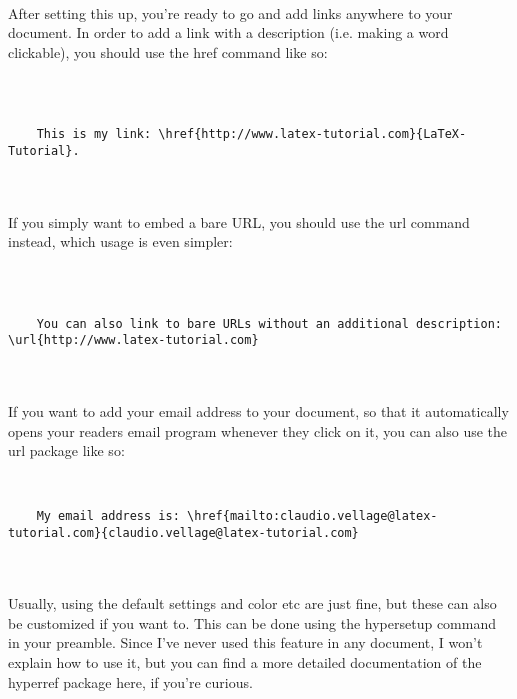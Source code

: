   \paragraph{}
  After setting this up, you're ready to go and add links anywhere to your document. In order to add a link with a description (i.e. making a word clickable), you should use the href command like so:
  \begin{lstlisting}[language={[LaTeX]TeX},breaklines=true,frame=single]
    %...

    
    
    This is my link: \href{http://www.latex-tutorial.com}{LaTeX-Tutorial}.
    
    
  \end{lstlisting}




  \paragraph{}
  If you simply want to embed a bare URL, you should use the url command instead, which usage is even simpler:
  \begin{lstlisting}[language={[LaTeX]TeX},breaklines=true,frame=single]
    %...

    
    
    You can also link to bare URLs without an additional description: \url{http://www.latex-tutorial.com}
    
    
  \end{lstlisting} 
  \paragraph{}
  If you want to add your email address to your document, so that it automatically opens your readers email program whenever they click on it, you can also use the url package like so:
  \begin{lstlisting}[language={[LaTeX]TeX},breaklines=true,frame=single]
    

    My email address is: \href{mailto:claudio.vellage@latex-tutorial.com}{claudio.vellage@latex-tutorial.com}
    
    
  \end{lstlisting}  
  
  \paragraph{}
  Usually, using the default settings and color etc are just fine, but these can also be customized if you want to. This can be done using the hypersetup command in your preamble. Since I've never used this feature in any document, I won't explain how to use it, but you can find a more detailed documentation of the hyperref package here, if you're curious.
  

